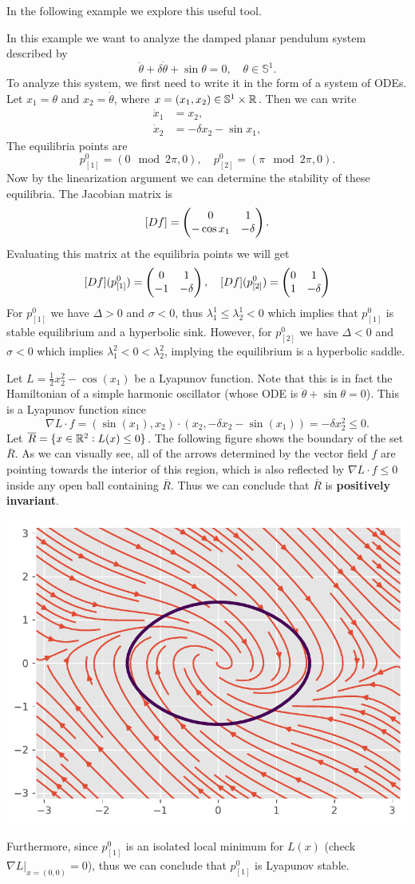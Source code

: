 In the following example we explore this useful tool.
\begin{example}
	In this example we want to analyze the damped planar pendulum system described by
	\[ \ddot{\theta} + \delta \dot{\theta} + \sin\theta  = 0,\quad \theta \in \mathbb{S}^1.\]
	To analyze this system, we first need to write it in the form of a system of ODEs. Let $x_1 = \theta$ and $x_2 = \dot{\theta}$, where $x=(x_1,x_2)\in\mathbb{S}^1\times\mathbb{R}$. Then we can write
	\begin{align*}
		\dot{x}_1 &= x_2,\\
		\dot{x}_2 &= -\delta x_2 - \sin x_1,
	\end{align*}
	The equilibria points are 
	\[ p^0_{[1]} = (0\mod{2\pi},0), \quad p^0_{[2]} = (\pi \mod{2\pi},0). \]
	Now by the linearization argument we can determine the stability of these equilibria. The Jacobian matrix is
	\[ [Df] = \begin{pmatrix} 0 & 1 \\ -\cos x_1 & -\delta \end{pmatrix}. \]
	Evaluating this matrix at the equilibria points we will get
	\[ [Df](p^0_{[1]}) = \begin{pmatrix} 0 & 1 \\ -1 & -\delta \end{pmatrix}, \quad [Df](p^0_{[2]}) = \begin{pmatrix} 0 & 1 \\ 1 & -\delta \end{pmatrix} \]
	For $p^0_{[1]}$ we have $\Delta>0$ and $\sigma<0$, thus $\lambda^1_1\leq\lambda^1_2<0$ which implies that $p^0_{[1]}$ is stable equilibrium and a hyperbolic sink. However, for $ p^0_{[2]}$ we have $\Delta<0$ and $\sigma<0$ which implies $\lambda^2_1 < 0 < \lambda^2_2$, implying the equilibrium is a hyperbolic saddle.
	
	Let $L = \frac{1}{2} x_2^2 - \cos(x_1)$ be a Lyapunov function. Note that this is in fact the Hamiltonian of a simple harmonic oscillator (whose ODE is $\ddot{\theta} + \sin\theta = 0$). This is a Lyapunov function since 
	\[ \nabla L \cdot f = (\sin(x_1),x_2)\cdot (x_2, -\delta x_2 - \sin(x_1)) = -\delta x_2^2 \leq 0. \]
	Let $\overline{R}=\{x\in\mathbb{R}^2: L(x)\leq0\}$. The following figure shows the boundary of the set $\overline{R}$. As we can visually see, all of the arrows determined by the vector field $f$ are pointing towards the interior of this region, which is also reflected by $\nabla L \cdot f \leq 0$ inside any open ball containing $\overline{R}$. Thus we can conclude that $\overline{R}$ is \textbf{positively invariant}. 
	\begin{center}
		\includegraphics[width=0.5\linewidth]{Images/LyapunovExample.pdf}
	\end{center}
	
	Furthermore, since $p^0_{[1]}$ is an isolated local minimum for $L(x)$ (check $\nabla L \big|_{x=(0,0)} = 0$), thus we can conclude that $p^0_{[1]}$ is Lyapunov stable.

\end{example}








